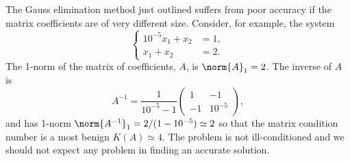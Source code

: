 The Gauss elimination method just outlined suffers from poor accuracy
if the matrix coefficients are of very different size.   Consider, for
example, the system
%
\begin{equation*}
  \begin{cases}
    10^{-5} x_1 + x_2 &= 1 , \\ x_1 + x_2 &= 2 .
  \end{cases}
\end{equation*}
%
The 1-norm of the matrix of coefficients, $A$, is $\norm{ A }_1 =
2$.  The inverse of $A$ is
%
\begin{equation*}
  A^{-1} = \frac{1}{10^{-5}-1}
  \begin{pmatrix}
    1 & -1 \\ -1 & 10^{-5}
  \end{pmatrix} ,
\end{equation*}
%
and has 1-norm $\norm{A^{-1}}_1 = 2/(1-10^{-5}) \simeq 2$ so that the
matrix condition number is a most benign $K(A) \simeq 4$.   The problem
is not ill-conditioned and we should not expect any problem in finding
an accurate solution.

